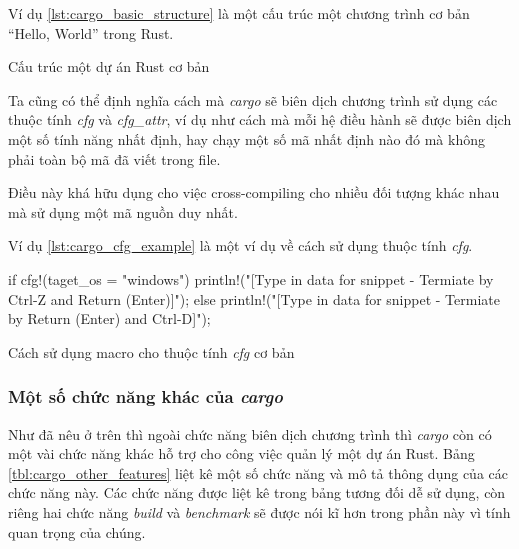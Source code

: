 Ví dụ \ref{lst:cargo_basic_structure} là một cấu trúc một chương trình cơ bản ``Hello, World'' trong Rust.
\begin{listing}
\caption{Cấu trúc một dự án Rust cơ bản}
\label{lst:cargo_basic_structure}
\end{listing}

Ta cũng có thể định nghĩa cách mà \emph{cargo} sẽ biên dịch chương trình sử dụng các thuộc tính \emph{cfg} và \emph{cfg\_attr}, ví dụ như cách mà mỗi hệ điều hành sẽ được biên dịch một số tính năng nhất định, hay chạy một số mã nhất định nào đó mà không phải toàn bộ mã đã viết trong file.

Điều này khá hữu dụng cho việc cross-compiling cho nhiều đối tượng khác nhau mà sử dụng một mã nguồn duy nhất.

Ví dụ \ref{lst:cargo_cfg_example} là một ví dụ về cách sử dụng thuộc tính \emph{cfg}.
\begin{listing}
\begin{rustcode}
if cfg!(taget_os = "windows") {
    println!("[Type in data for snippet - Termiate by Ctrl-Z and Return (Enter)]");
} else {
    println!("[Type in data for snippet - Termiate by Return (Enter) and Ctrl-D]");
}
\end{rustcode}
\caption{Cách sử dụng macro cho thuộc tính \emph{cfg} cơ bản}
\label{lst:cargo_cfg_example}
\end{listing}

\subsubsection{Một số chức năng khác của \emph{cargo}}\label{lbl:cargo_other_features}
Như đã nêu ở trên thì ngoài chức năng biên dịch chương trình thì \emph{cargo} còn có một vài chức năng khác hỗ trợ cho công việc quản lý một dự án Rust.
Bảng \ref{tbl:cargo_other_features} liệt kê một số chức năng và mô tả thông dụng của các chức năng này.
Các chức năng được liệt kê trong bảng tương đối dễ sử dụng, còn riêng hai chức năng \emph{build} và \emph{benchmark} sẽ được nói kĩ hơn trong phần này vì tính quan trọng của chúng.

